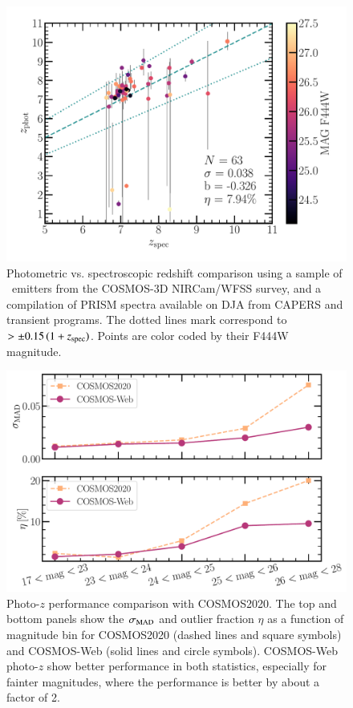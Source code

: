 \documentclass[longauth]{aa}
\begin{document}
\begin{figure}[t!]
\includegraphics[width=1\columnwidth]{figures/specz-vs-photz-COSMOS3D+DJA.pdf}
\caption{Photometric vs. spectroscopic redshift comparison using a sample of \oiii\ emitters from the COSMOS-3D NIRCam/WFSS survey, and a compilation of PRISM spectra available on DJA from CAPERS and transient programs. The dotted lines mark correspond to \zphot $> \pm 0.15\,(1+z_{\rm spec})$. Points are color coded by their F444W magnitude.
}
\label{fig:photoz-specz-c3d}
\end{figure}

\begin{figure}[t!]
\includegraphics[width=1\columnwidth]{figures/photo-z-performance_cweb-vs-c20.pdf}
\caption{Photo-$z$ performance comparison with COSMOS2020. The top and bottom panels show the $\sigma_{\rm MAD}$ and outlier fraction $\eta$ as a function of magnitude bin for COSMOS2020 (dashed lines and square symbols) and COSMOS-Web (solid lines and circle symbols). COSMOS-Web photo-$z$ show better performance in both statistics, especially for fainter magnitudes, where the performance is better by about a factor of 2.
}
\label{fig:zphot-cweb-vs-c20}
\end{figure}
\end{document}
